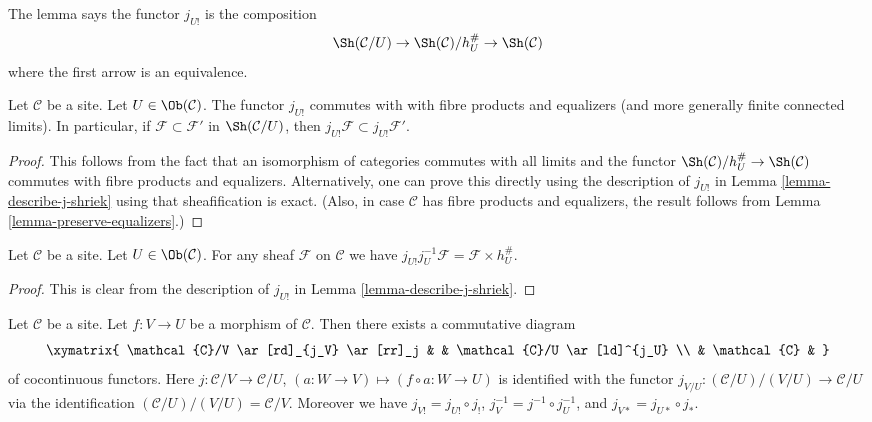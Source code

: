 \noindent
The lemma says the functor $j_{U!}$ is the composition
$$
\Sh(\mathcal{C}/U) \rightarrow
\Sh(\mathcal{C})/h_U^\# \rightarrow
\Sh(\mathcal{C})
$$
where the first arrow is an equivalence.

\begin{lemma}
\label{lemma-j-shriek-commutes-equalizers-fibre-products}
Let $\mathcal{C}$ be a site. Let $U \in \Ob(\mathcal{C})$.
The functor $j_{U!}$ commutes with with fibre products and equalizers (and
more generally finite connected limits). In particular, if
$\mathcal{F} \subset \mathcal{F}'$ in $\Sh(\mathcal{C}/U)$, then
$j_{U!}\mathcal{F} \subset j_{U!}\mathcal{F}'$.
\end{lemma}

\begin{proof}
This follows from the fact that an isomorphism of categories commutes
with all limits and the functor
$\Sh(\mathcal{C})/h_U^\# \rightarrow \Sh(\mathcal{C})$
commutes with fibre products and equalizers. Alternatively, one can
prove this directly using the description of $j_{U!}$ in
Lemma \ref{lemma-describe-j-shriek}
using that sheafification is exact. (Also, in case $\mathcal{C}$ has
fibre products and equalizers, the result follows from
Lemma \ref{lemma-preserve-equalizers}.)
\end{proof}

\begin{lemma}
\label{lemma-compute-j-shriek-restrict}
Let $\mathcal{C}$ be a site. Let $U \in \Ob(\mathcal{C})$.
For any sheaf $\mathcal{F}$ on $\mathcal{C}$ we have
$j_{U!}j_U^{-1}\mathcal{F} = \mathcal{F} \times h_U^\#$.
\end{lemma}

\begin{proof}
This is clear from the description of $j_{U!}$ in
Lemma \ref{lemma-describe-j-shriek}.
\end{proof}

\begin{lemma}
\label{lemma-relocalize}
Let $\mathcal{C}$ be a site.
Let $f : V \to U$ be a morphism of $\mathcal{C}$.
Then there exists a commutative diagram
$$
\xymatrix{
\mathcal{C}/V \ar[rd]_{j_V} \ar[rr]_j & &
\mathcal{C}/U \ar[ld]^{j_U} \\
& \mathcal{C} &
}
$$
of cocontinuous functors. Here $j : \mathcal{C}/V \to \mathcal{C}/U$,
$(a : W \to V) \mapsto (f \circ a : W \to U)$
is identified with the functor
$j_{V/U} : (\mathcal{C}/U)/(V/U) \to \mathcal{C}/U$
via the identification $(\mathcal{C}/U)/(V/U) = \mathcal{C}/V$.
Moreover we have $j_{V!} = j_{U!} \circ j_!$,
$j_V^{-1} = j^{-1} \circ j_U^{-1}$, and $j_{V*} = j_{U*} \circ j_*$.
\end{lemma}

